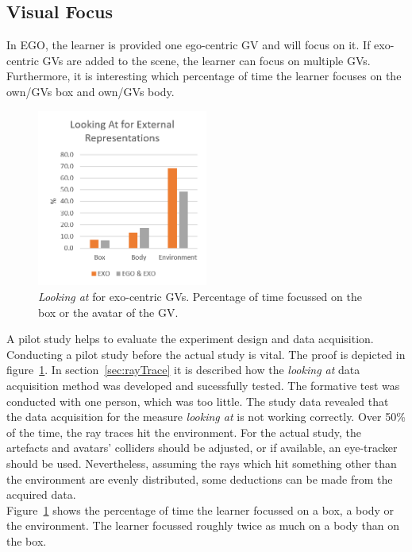 \subsection{Visual Focus}
In EGO, the learner is provided one ego-centric GV and will focus on it. If exo-centric GVs are added to the scene, the learner can focus on multiple GVs. Furthermore, it is interesting which percentage of time the learner focuses on the own/GVs box and own/GVs body.\\
\begin{figure}[htb]
	\centering
	\includegraphics[width=0.5\textwidth]{figures/lookingAtExternalRepresentations.png}
	\caption[\textit{Looking at} for exo-centric guidance visualisations]{\textit{Looking at} for exo-centric GVs. Percentage of time focussed on the box or the avatar of the GV.}
	\label{fig:lookingAtExternal}
\end{figure}
A pilot study helps to evaluate the experiment design and data acquisition. Conducting a pilot study before the actual study is vital. The proof is depicted in figure~\ref{fig:lookingAtExternal}. In section~\ref{sec:rayTrace} it is described how the \textit{looking at} data acquisition method was developed and sucessfully tested. The formative test was conducted with one person, which was too little. The study data revealed that the data acquisition for the measure \textit{looking at} is not working correctly. Over 50\% of the time, the ray traces hit the environment. For the actual study, the artefacts and avatars' colliders should be adjusted, or if available, an eye-tracker should be used. Nevertheless, assuming the rays which hit something other than the environment are evenly distributed, some deductions can be made from the acquired data.\\
Figure~\ref{fig:lookingAtExternal} shows the percentage of time the learner focussed on a box, a body or the environment. The learner focussed roughly twice as much on a body than on the box.\\
